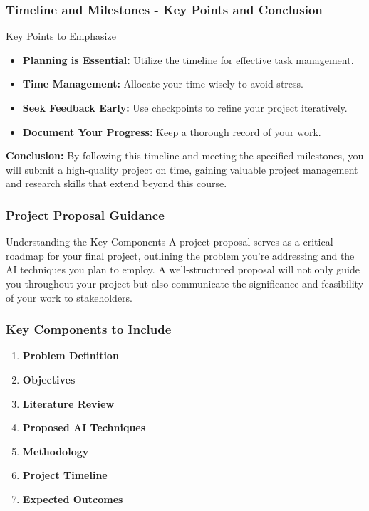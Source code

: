 \documentclass{beamer}
\begin{document}
\begin{frame}[fragile]
    \frametitle{Timeline and Milestones - Key Points and Conclusion}
    \begin{block}{Key Points to Emphasize}
        \begin{itemize}
            \item \textbf{Planning is Essential:} Utilize the timeline for effective task management.
            \item \textbf{Time Management:} Allocate your time wisely to avoid stress.
            \item \textbf{Seek Feedback Early:} Use checkpoints to refine your project iteratively.
            \item \textbf{Document Your Progress:} Keep a thorough record of your work.
        \end{itemize}
    \end{block}
    
    \textbf{Conclusion:} By following this timeline and meeting the specified milestones, you will submit a high-quality project on time, gaining valuable project management and research skills that extend beyond this course.
\end{frame}

\begin{frame}[fragile]
    \frametitle{Project Proposal Guidance}
    \begin{block}{Understanding the Key Components}
        A project proposal serves as a critical roadmap for your final project, outlining the problem you're addressing and the AI techniques you plan to employ.
        A well-structured proposal will not only guide you throughout your project but also communicate the significance and feasibility of your work to stakeholders.
    \end{block}
\end{frame}

\begin{frame}[fragile]
    \frametitle{Key Components to Include}
    \begin{enumerate}
        \item \textbf{Problem Definition}
        \item \textbf{Objectives}
        \item \textbf{Literature Review}
        \item \textbf{Proposed AI Techniques}
        \item \textbf{Methodology}
        \item \textbf{Project Timeline}
        \item \textbf{Expected Outcomes}
    \end{enumerate}
\end{frame}
\end{document}
